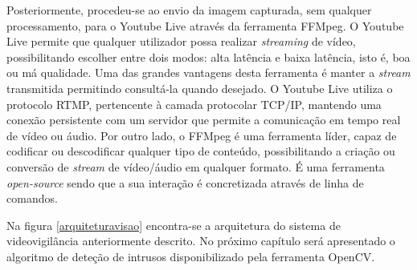 Posteriormente, procedeu-se ao envio da imagem capturada, sem qualquer processamento, para o Youtube Live através da ferramenta FFMpeg. O Youtube Live permite que qualquer utilizador possa realizar \textit{streaming} de vídeo, possibilitando escolher entre dois modos: alta latência e baixa latência, isto é, boa ou má qualidade. Uma das grandes vantagens desta ferramenta é manter a \textit{stream} transmitida permitindo consultá-la quando desejado. O Youtube Live utiliza o protocolo \ac{RTMP}, pertencente à camada protocolar TCP/IP, mantendo uma conexão persistente com um servidor que permite a comunicação em tempo real de vídeo ou áudio. Por outro lado, o FFMpeg é uma ferramenta líder, capaz de codificar ou descodificar qualquer tipo de conteúdo, possibilitando a criação ou conversão de \textit{stream} de vídeo/áudio em qualquer formato. É uma ferramenta \textit{open-source} sendo que a sua interação é concretizada através de linha de comandos\cite{FFmpeg2015}. 




Na figura \ref{arquiteturavisao} encontra-se a arquitetura do sistema de videovigilância anteriormente descrito. No próximo capítulo será apresentado o algoritmo de deteção de intrusos disponibilizado pela ferramenta OpenCV. 









